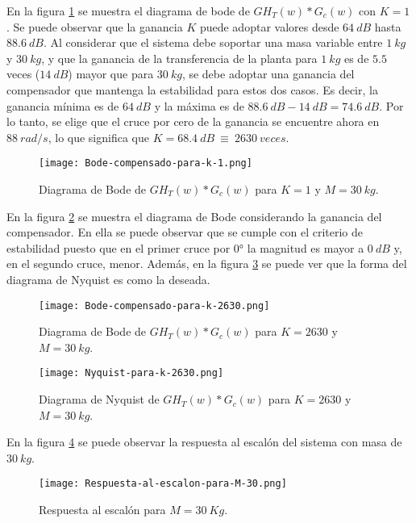 En la figura \ref{fig:bode-compensado-para-k-1} se muestra el diagrama de bode de ${GH}_T(w)*G_c(w)$ con $K=1$. Se puede observar que la ganancia $K$ puede adoptar valores desde $64\:dB$ hasta $88.6\:dB$. Al considerar que el sistema debe soportar una masa variable entre $1\:kg$ y $30\:kg$, y que la ganancia de la transferencia de la planta para $1\:kg$ es de $5.5$ veces ($14\:dB$) mayor que para $30\:kg$, se debe adoptar una ganancia del compensador que mantenga la estabilidad para estos dos casos. Es decir, la ganancia m\'{i}nima es de $64\:dB$ y la m\'{a}xima es de $88.6\:dB - 14\:dB = 74.6\:dB$. Por lo tanto, se elige que el cruce por cero de la ganancia se encuentre ahora en $88\:rad/s$, lo que significa que $K=68.4\:dB\ \equiv \ 2630\:veces$.


\begin{figure}[H]
	\centering
	\texttt{[image: Bode-compensado-para-k-1.png]}
	\caption{Diagrama de Bode de $GH_T(w)*G_c(w)$ para $K=1$ y $M=30\:kg$.}
	\label{fig:bode-compensado-para-k-1}
\end{figure}


 En la figura \ref{fig:bode-compensado-para-k-2630} se muestra el diagrama de Bode considerando la ganancia del compensador. En ella se puede observar que se  cumple con el criterio de estabilidad puesto que en el primer cruce por 0° la magnitud es mayor a $0\:dB$ y, en el segundo cruce, menor. Adem\'{a}s, en la figura \ref{fig:nyquist-para-k-2630} se puede ver que la forma del diagrama de Nyquist es como la deseada.

\begin{figure}[H]
	\centering
	\texttt{[image: Bode-compensado-para-k-2630.png]}
	\caption{Diagrama de Bode de $GH_T(w)*G_c(w)$ para $K=2630$ y $M=30\:kg$.}
	\label{fig:bode-compensado-para-k-2630}
\end{figure}

\begin{figure}[H]
	\centering
	\texttt{[image: Nyquist-para-k-2630.png]}
	\caption{Diagrama de Nyquist de $GH_T(w)*G_c(w)$ para $K=2630$ y $M=30\:kg$.}
	\label{fig:nyquist-para-k-2630}
\end{figure}

 En la figura \ref{fig:respuesta-al-escalon-para-M-30} se puede observar la respuesta al escal\'{o}n del sistema con masa de $30\:kg$.


\begin{figure}[H]
	\centering
	\texttt{[image: Respuesta-al-escalon-para-M-30.png]}
	\caption{Respuesta al escalón para $M=30\:Kg$.}
	\label{fig:respuesta-al-escalon-para-M-30}
\end{figure}

